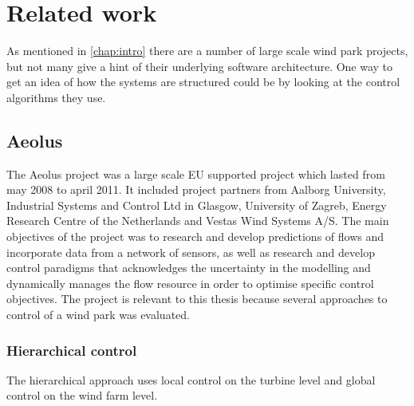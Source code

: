 \chapter{Related work}
As mentioned in \cref{chap:intro} there are a number of large scale wind park projects, but not many give a hint of their underlying software architecture.
One way to get an idea of how the systems are structured could be by looking at the control algorithms they use.


\section{Aeolus}
The Aeolus project was a large scale EU supported project which lasted from may 2008 to april 2011. It included project partners from 
Aalborg University, Industrial Systems and Control Ltd in Glasgow, University of Zagreb, Energy Research Centre of the Netherlands and Vestas Wind Systems A/S.
The main objectives of the project was to research and develop predictions of flows and incorporate data from a network of sensors, as well as research and develop control paradigms that acknowledges the uncertainty in the modelling and dynamically manages the flow resource in order to optimise specific control objectives.
The project is relevant to this thesis because several approaches to control of a wind park was evaluated.

\subsection{Hierarchical control}
The hierarchical approach uses local control on the turbine level and global control on the wind farm level\cite{HeirarchicalWindFarmControl}.


